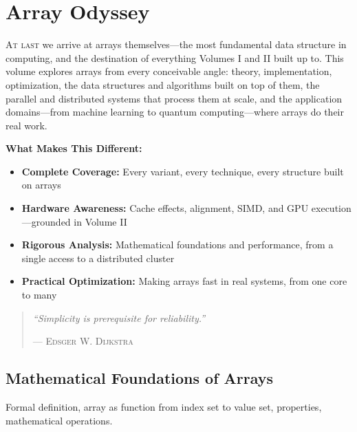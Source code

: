 \part{Array Odyssey}
\label{part:array-odyssey}

\begin{volumesintro}
\lettrine[lines=3]{A}{t last} we arrive at arrays themselves---the most fundamental data structure in computing, and the destination of everything Volumes I and II built up to. This volume explores arrays from every conceivable angle: theory, implementation, optimization, the data structures and algorithms built on top of them, the parallel and distributed systems that process them at scale, and the application domains---from machine learning to quantum computing---where arrays do their real work.

\vspace{1em}
\textbf{What Makes This Different:}
\begin{itemize}[noitemsep]
    \item \textbf{Complete Coverage:} Every variant, every technique, every structure built on arrays
    \item \textbf{Hardware Awareness:} Cache effects, alignment, SIMD, and GPU execution---grounded in Volume II
    \item \textbf{Rigorous Analysis:} Mathematical foundations and performance, from a single access to a distributed cluster
    \item \textbf{Practical Optimization:} Making arrays fast in real systems, from one core to many
\end{itemize}

\begin{quote}
\textit{``Simplicity is prerequisite for reliability.''}

\hfill--- \textsc{Edsger W. Dijkstra}
\end{quote}
\end{volumesintro}


\chapter{Mathematical Foundations of Arrays}
Formal definition, array as function from index set to value set, properties, mathematical operations.

